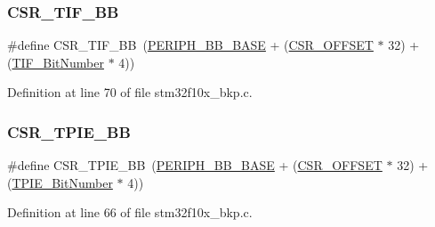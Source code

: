 \subsubsection{\texorpdfstring{C\+S\+R\+\_\+\+T\+I\+F\+\_\+\+BB}{CSR\_TIF\_BB}}
{\footnotesize\ttfamily \#define C\+S\+R\+\_\+\+T\+I\+F\+\_\+\+BB~(\hyperlink{group___peripheral__memory__map_gaed7efc100877000845c236ccdc9e144a}{P\+E\+R\+I\+P\+H\+\_\+\+B\+B\+\_\+\+B\+A\+SE} + (\hyperlink{group___r_c_c___private___defines_ga984cbe73312b6d3d355c5053763d499a}{C\+S\+R\+\_\+\+O\+F\+F\+S\+ET} $\ast$ 32) + (\hyperlink{group___b_k_p___private___defines_gac8b1b82c7029c05e720c50585762bcf2}{T\+I\+F\+\_\+\+Bit\+Number} $\ast$ 4))}



Definition at line 70 of file stm32f10x\+\_\+bkp.\+c.

\mbox{\label{group___b_k_p___private___defines_ga1f6dcf729994613b21f554ca371d393c}} 
\subsubsection{\texorpdfstring{C\+S\+R\+\_\+\+T\+P\+I\+E\+\_\+\+BB}{CSR\_TPIE\_BB}}
{\footnotesize\ttfamily \#define C\+S\+R\+\_\+\+T\+P\+I\+E\+\_\+\+BB~(\hyperlink{group___peripheral__memory__map_gaed7efc100877000845c236ccdc9e144a}{P\+E\+R\+I\+P\+H\+\_\+\+B\+B\+\_\+\+B\+A\+SE} + (\hyperlink{group___r_c_c___private___defines_ga984cbe73312b6d3d355c5053763d499a}{C\+S\+R\+\_\+\+O\+F\+F\+S\+ET} $\ast$ 32) + (\hyperlink{group___b_k_p___private___defines_gac62e6ae9548498efa47fb72637545117}{T\+P\+I\+E\+\_\+\+Bit\+Number} $\ast$ 4))}



Definition at line 66 of file stm32f10x\+\_\+bkp.\+c.

\mbox{\label{group___b_k_p___private___defines_ga61a540c5dd9d18e936b8fd3e01f7f6ff}} 
